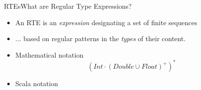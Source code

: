 \newsavebox\exnotebox
\begin{lrbox}{\exnotebox}
  \begin{minipage}{7cm}
    
  \end{minipage}
\end{lrbox}


\begin{frame}{RTEs}{What are Regular Type Expressions?}
  \begin{itemize}
  \item An RTE is an \emph{expression} designating a set  of finite sequences
  \item ... based on regular patterns in the \emph{types} of their content.
  \item Mathematical notation
    \[(Int \cdot (Double \cup Float)^+)^*\]
  \item Scala notation\\
    \usebox\exnotebox
  \end{itemize}
\end{frame}
